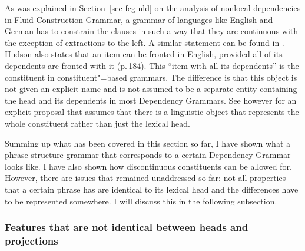 As was explained in Section~\ref{sec-fcg-nld} on the analysis of nonlocal dependencies in Fluid
Construction Grammar\indexfcg, a grammar of languages like English and German has to constrain the clauses in such a way that they are
continuous with the exception of extractions to the left. A similar statement can be found in
. Hudson also states that an item can be fronted in English,
provided all of its dependents are fronted with it (p.\,184). This ``item with all its dependents'' is the
constituent in constituent"=based grammars. The difference is that this object is not given an
explicit name and is not assumed to be a separate entity containing the head and its dependents in most Dependency Grammars. See however \citet{Hellwig2003a} for an explicit
proposal that assumes that there is a linguistic object that represents the whole constituent rather
than just the lexical head.

Summing up what has been covered in this section so far, I have shown what a phrase structure
grammar that corresponds to a certain Dependency Grammar looks like. I have also shown how discontinuous
constituents can be allowed for. However, there are issues that remained unaddressed so far: not all
properties that a certain phrase has are identical to its lexical head and the differences have to
be represented somewhere. I will discuss this in the following subsection.

\subsubsection{Features that are not identical between heads and projections}
\label{sec-dg-daughters-mothers}
\label{sec-dg-is-simpler}

